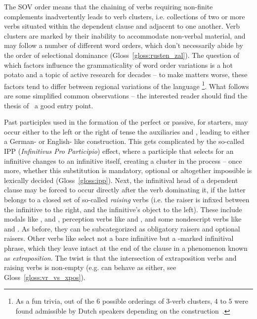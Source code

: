 The SOV order means that the chaining of verbs requiring non-finite complements inadvertently leads to verb clusters, i.e. collections of two or more verbs situated within the dependent clause and adjacent to one another.
Verb clusters are marked by their inability to accommodate non-verbal material, and may follow a number of different word orders, which don't necessarily abide by the order of selectional dominance (Gloss~\ref{gloss:rusten_zal}).
The question of which factors influence the grammaticality of word order variations  is a hot potato and a topic of active research for decades -- to make matters worse, these factors tend to differ between regional variations of the language%
	\footnote{As a fun trivia,  out of the 6 possible orderings of 3-verb clusters, 4 to 5 were found admissible by Dutch speakers depending on the construction~\cite{3vc}.}.
What follows are some simplified common observations -- the interested reader should find the thesis of~\citet{augustinus2015complement} a good entry point.

Past participles used in the formation of the perfect or passive, for starters, may occur either to the left or the right of tense the auxiliaries  and , leading to either a German- or English- like construction.
This gets complicated by the so-called IPP (\textit{Infinitivus Pro Participio}) effect, where a participle that selects for an infinitive changes to an infinitive itself, creating a cluster in the process -- once more, whether this substitution is mandatory, optional or altogether impossible is lexically decided (Gloss~\ref{gloss:ipp}).
Next, the infinitival head of a dependent clause may be forced to occur directly after the verb dominating it, if the latter belongs to a closed set of so-called \textit{raising} verbs (i.e. the raiser is infixed between the infinitive to the right, and the infinitive's object to the left).
These include modals like ,  and , perception verbs like  and , and some nondescript verbs like  and .
As before, they can be subcategorized as obligatory raisers and optional raisers.
Other verbs like  select not a bare infinitive but a -marked infinitival phrase, which they leave intact at the end of the clause in a phenomenon known as \textit{extraposition}.
The twist is that the intersection of extraposition verbs and raising verbs is non-empty (e.g.  can behave as either, see Gloss~\ref{gloss:vr_vs_xpos}).

